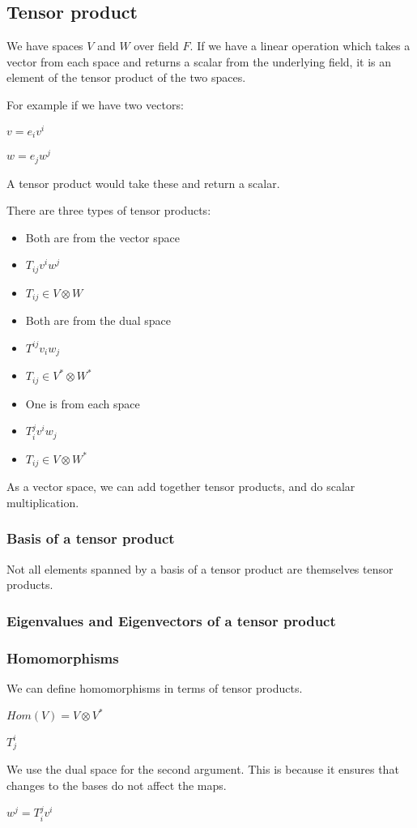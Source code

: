 
\subsection{Tensor product}

We have spaces \(V\) and \(W\) over field \(F\). If we have a linear operation which takes a vector from each space and returns a scalar from the underlying field, it is an element of the tensor product of the two spaces.

For example if we have two vectors:

\(v=e_iv^i\)

\(w=e_jw^j\)

A tensor product would take these and return a scalar.

There are three types of tensor products:

\begin{itemize}
\item Both are from the vector space
\item \(T_{ij}v^iw^j\)
\item \(T_{ij} \in V\otimes W\)
\item Both are from the dual space
\item \(T^{ij}v_iw_j\)
\item \(T_{ij} \in V^*\otimes W^*\)
\item One is from each space
\item \(T_i^jv^iw_j\)
\item \(T_{ij} \in V\otimes W^*\)
\end{itemize}


As a vector space, we can add together tensor products, and do scalar multiplication.

\subsubsection{Basis of a tensor product}

Not all elements spanned by a basis of a tensor product are themselves tensor products.

\subsubsection{Eigenvalues and Eigenvectors of a tensor product}

\subsubsection{Homomorphisms}

We can define homomorphisms in terms of tensor products.

\(Hom (V) =V \otimes V^*\)

\(T_j^i\)

We use the dual space for the second argument. This is because it ensures that changes to the bases do not affect the maps.

\(w^j=T_i^j v^i\)


